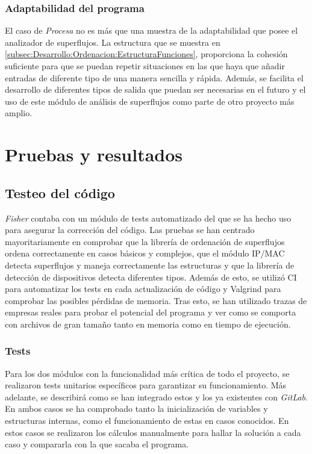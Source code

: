 \documentclass[twoside, 12pt]{epstfg}
\begin{document}
\subsection{Adaptabilidad del programa}
El caso de \textit{Procesa} no es más que una muestra de la adaptabilidad que posee el analizador de superflujos. La estructura que se muestra en \ref{subsec:Desarrollo:Ordenacion:EstructuraFunciones}, proporciona la cohesión suficiente para que se puedan repetir situaciones en las que haya que añadir entradas de diferente tipo de una manera sencilla y rápida. Además, se facilita el desarrollo de diferentes tipos de salida que puedan ser necesarias en el futuro y el uso de este módulo de análisis de superflujos como parte de otro proyecto más amplio.

\chapter{Pruebas y resultados}
\section{Testeo del código}
\label{chap:Pruebas:Test}
\textit{Fisher} contaba con un módulo de tests automatizado del que se ha hecho uso para asegurar la corrección del código. Las pruebas se han centrado mayoritariamente en comprobar que la librería de ordenación de superflujos ordena correctamente en casos básicos y complejos, que el módulo IP/MAC detecta superflujos y maneja correctamente las estructuras y que la librería de detección de dispositivos detecta diferentes tipos. Además de esto, se utilizó CI para automatizar los tests en cada actualización de código y Valgrind para comprobar las posibles pérdidas de memoria. Tras esto, se han utilizado trazas de empresas reales para probar el potencial del programa y ver como se comporta con archivos de gran tamaño tanto en memoria como en tiempo de ejecución. 

\subsection{Tests}
\label{subsec:Pruebas:Tests:Tests}

Para los dos módulos con la funcionalidad más crítica de todo el proyecto, se realizaron tests unitarios específicos para garantizar su funcionamiento. Más adelante, se describirá como se han integrado estos y los ya existentes con \textit{GitLab}. En ambos casos se ha comprobado tanto la inicialización de variables y estructuras internas, como el funcionamiento de estas en casos conocidos. En estos casos se realizaron los cálculos manualmente para hallar la solución a cada caso y compararla con la que sacaba el programa.
\end{document}
